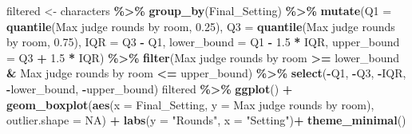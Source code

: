 \documentclass[
]{article}
\newenvironment{Shaded}{\begin{snugshade}}{\end{snugshade}}
\newcommand{\AttributeTok}[1]{\textcolor[rgb]{0.13,0.29,0.53}{#1}}
\newcommand{\ConstantTok}[1]{\textcolor[rgb]{0.56,0.35,0.01}{#1}}
\newcommand{\FloatTok}[1]{\textcolor[rgb]{0.00,0.00,0.81}{#1}}
\newcommand{\FunctionTok}[1]{\textcolor[rgb]{0.13,0.29,0.53}{\textbf{#1}}}
\newcommand{\NormalTok}[1]{#1}
\newcommand{\OtherTok}[1]{\textcolor[rgb]{0.56,0.35,0.01}{#1}}
\newcommand{\SpecialCharTok}[1]{\textcolor[rgb]{0.81,0.36,0.00}{\textbf{#1}}}
\newcommand{\StringTok}[1]{\textcolor[rgb]{0.31,0.60,0.02}{#1}}
\begin{document}
\begin{Shaded}
\begin{Highlighting}[]
\NormalTok{filtered }\OtherTok{\textless{}{-}}\NormalTok{ characters }\SpecialCharTok{\%\textgreater{}\%}
  \FunctionTok{group\_by}\NormalTok{(Final\_Setting) }\SpecialCharTok{\%\textgreater{}\%}
  \FunctionTok{mutate}\NormalTok{(}\AttributeTok{Q1 =} \FunctionTok{quantile}\NormalTok{(}\StringTok{\textasciigrave{}}\AttributeTok{Max judge rounds by room}\StringTok{\textasciigrave{}}\NormalTok{, }\FloatTok{0.25}\NormalTok{),}
         \AttributeTok{Q3 =} \FunctionTok{quantile}\NormalTok{(}\StringTok{\textasciigrave{}}\AttributeTok{Max judge rounds by room}\StringTok{\textasciigrave{}}\NormalTok{, }\FloatTok{0.75}\NormalTok{),}
         \AttributeTok{IQR =}\NormalTok{ Q3 }\SpecialCharTok{{-}}\NormalTok{ Q1,}
         \AttributeTok{lower\_bound =}\NormalTok{ Q1 }\SpecialCharTok{{-}} \FloatTok{1.5} \SpecialCharTok{*}\NormalTok{ IQR,}
         \AttributeTok{upper\_bound =}\NormalTok{ Q3 }\SpecialCharTok{+} \FloatTok{1.5} \SpecialCharTok{*}\NormalTok{ IQR) }\SpecialCharTok{\%\textgreater{}\%}
  \FunctionTok{filter}\NormalTok{(}\StringTok{\textasciigrave{}}\AttributeTok{Max judge rounds by room}\StringTok{\textasciigrave{}} \SpecialCharTok{\textgreater{}=}\NormalTok{ lower\_bound }\SpecialCharTok{\&} \StringTok{\textasciigrave{}}\AttributeTok{Max judge rounds by room}\StringTok{\textasciigrave{}} \SpecialCharTok{\textless{}=}\NormalTok{ upper\_bound) }\SpecialCharTok{\%\textgreater{}\%}
  \FunctionTok{select}\NormalTok{(}\SpecialCharTok{{-}}\NormalTok{Q1, }\SpecialCharTok{{-}}\NormalTok{Q3, }\SpecialCharTok{{-}}\NormalTok{IQR, }\SpecialCharTok{{-}}\NormalTok{lower\_bound, }\SpecialCharTok{{-}}\NormalTok{upper\_bound)}
\NormalTok{filtered }\SpecialCharTok{\%\textgreater{}\%}
  \FunctionTok{ggplot}\NormalTok{() }\SpecialCharTok{+}
  \FunctionTok{geom\_boxplot}\NormalTok{(}\FunctionTok{aes}\NormalTok{(}\AttributeTok{x =}\NormalTok{ Final\_Setting, }\AttributeTok{y =} \StringTok{\textasciigrave{}}\AttributeTok{Max judge rounds by room}\StringTok{\textasciigrave{}}\NormalTok{), }\AttributeTok{outlier.shape =} \ConstantTok{NA}\NormalTok{) }\SpecialCharTok{+}
  \FunctionTok{labs}\NormalTok{(}\AttributeTok{y =} \StringTok{"Rounds"}\NormalTok{, }\AttributeTok{x =} \StringTok{"Setting"}\NormalTok{)}\SpecialCharTok{+}
  \FunctionTok{theme\_minimal}\NormalTok{()}
\end{Highlighting}
\end{Shaded}
\end{document}
